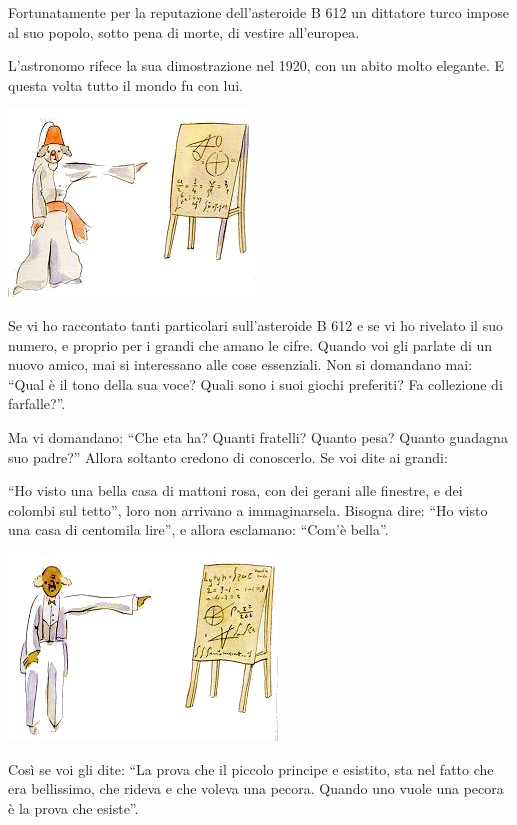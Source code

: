 \documentclass[11pt]{scrbook}
\begin{document}
Fortunatamente per la reputazione dell'asteroide B 612 un dittatore
turco impose al suo popolo, sotto pena di morte, di vestire all'europea.

L'astronomo rifece la sua dimostrazione nel 1920, con un abito molto
elegante. E questa volta tutto il mondo fu con lui.

\begin{center}
\includegraphics{img/4c}
\end{center}

Se vi ho raccontato tanti particolari sull'asteroide B 612 e se vi ho
rivelato il suo numero, e proprio per i grandi che amano le cifre.
Quando voi gli parlate di un nuovo amico, mai si interessano alle cose
essenziali. Non si domandano mai: ``Qual è il tono della sua voce? Quali
sono i suoi giochi preferiti? Fa collezione di farfalle?''.

Ma vi domandano: ``Che eta ha? Quanti fratelli? Quanto pesa? Quanto
guadagna suo padre?'' Allora soltanto credono di conoscerlo. Se voi dite
ai grandi:

``Ho visto una bella casa di mattoni rosa, con dei gerani alle finestre,
e dei colombi sul tetto'', loro non arrivano a immaginarsela. Bisogna
dire: ``Ho visto una casa di centomila lire'', e allora esclamano:
``Com'è bella''.

\begin{center}
\includegraphics{img/4d}
\end{center}

Così se voi gli dite: ``La prova che il piccolo principe e esistito, sta
nel fatto che era bellissimo, che rideva e che voleva una pecora. Quando
uno vuole una pecora è la prova che esiste''.
\end{document}
